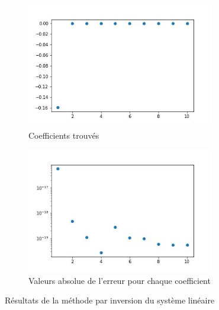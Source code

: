 \documentclass[12pt]{report}
\begin{document}
\begin{figure}
    \centering
    \begin{subfigure}[b]{0.4\textwidth}
        \centering
        \includegraphics[width=0.9\textwidth,height=0.9\textwidth]{coefs_1_inv.jpg}
        \caption{Coefficients trouvés}
    \end{subfigure}
    \hfill
    \begin{subfigure}[b]{0.4\textwidth}
        \centering
        \includegraphics[width=0.9\textwidth,height=0.9\textwidth]{coefs_1_inv_erreur.jpg}
        \caption{Valeurs absolue de l'erreur pour chaque coefficient}
    \end{subfigure}
    \caption{Résultats de la méthode par inversion du système linéaire}
    \label{fig:resultats_1_inv}
\end{figure}
\end{document}
